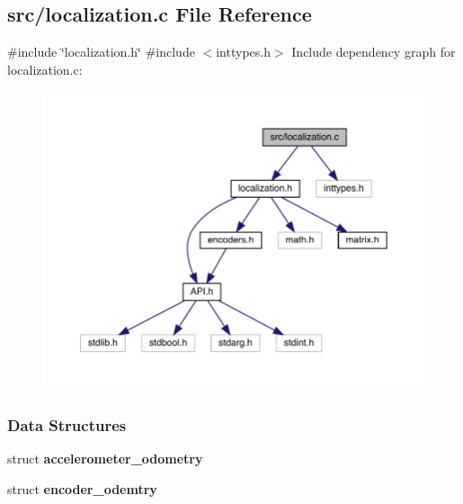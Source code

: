 \subsection{src/localization.c File Reference}
\label{localization_8c}
{\ttfamily \#include \char`\"{}localization.\+h\char`\"{}}\newline
{\ttfamily \#include $<$inttypes.\+h$>$}\newline
Include dependency graph for localization.\+c\+:\nopagebreak
\begin{figure}[H]
\begin{center}
\leavevmode
\includegraphics[width=350pt]{localization_8c__incl}
\end{center}
\end{figure}
\subsubsection*{Data Structures}
\begin{DoxyCompactItemize}
\item 
struct \textbf{ accelerometer\+\_\+odometry}
\item 
struct \textbf{ encoder\+\_\+odemtry}
\end{DoxyCompactItemize}
